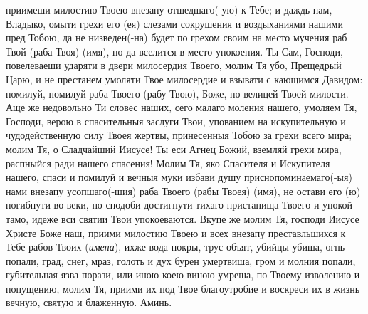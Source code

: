 \begin{mymulticols}
приимеши милостию Твоею внезапу отшедшаго(-ую) к Тебе; и даждь нам, Владыко, омыти грехи его (ея) слезами сокрушения и воздыханиями нашими пред Тобою, да не низведен(-на) будет по грехом своим на место мучения раб Твой (раба Твоя) (имя), но да вселится в место упокоения. Ты Сам, Господи, повелеваеши ударяти в двери милосердия Твоего, молим Тя убо, Прещедрый Царю, и не престанем умоляти Твое милосердие и взывати с кающимся Давидом: помилуй, помилуй раба Твоего (рабу Твою), Боже, по велицей Твоей милости. Аще же недовольно Ти словес наших, сего малаго моления нашего, умоляем Тя, Господи, верою в спасительныя заслуги Твои, упованием на искупительную и чудодейственную силу Твоея жертвы, принесенныя Тобою за грехи всего мира; молим Тя, о Сладчайший Иисусе! Ты еси Агнец Божий, вземляй грехи мира, распныйся ради нашего спасения! Молим Тя, яко Спасителя и Искупителя нашего, спаси и помилуй и вечныя муки избави душу приснопоминаемаго(-ыя) нами внезапу усопшаго(-шия) раба Твоего (рабы Твоея) (имя), не остави его (ю) погибнути во веки, но сподоби достигнути тихаго пристанища Твоего и упокой тамо, идеже вси святии Твои упокоеваются. Вкупе же молим Тя, господи Иисусе Христе Боже наш, приими милостию Твоею и всех внезапу преставльшихся к Тебе рабов Твоих ({\itshape имена}), ихже вода покры, трус объят, убийцы убиша, огнь попали, град, снег, мраз, голоть и дух бурен умертвиша, гром и молния попали, губительная язва порази, или иною коею виною умреша, по Твоему изволению и попущению, молим Тя, приими их под Твое благоутробие и воскреси их в жизнь вечную, святую и блаженную. Аминь.

\end{mymulticols}

\mychapterending


 


